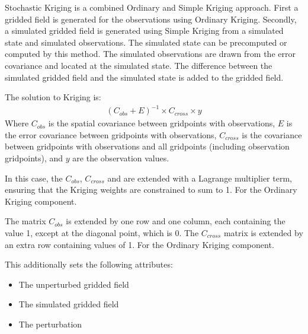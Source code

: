 \documentclass[letterpaper,10pt,english]{sphinxmanual}
\begin{document}
\begin{fulllineitems}
\begin{fulllineitems}
\sphinxAtStartPar
Stochastic Kriging is a combined Ordinary and Simple Kriging approach.
First a gridded field is generated for the observations using Ordinary
Kriging. Secondly, a simulated gridded field is generated using Simple
Kriging from a simulated state and simulated observations. The simulated
state can be pre\sphinxhyphen{}computed or computed by this method. The simulated
observations are drawn from the error covariance and located at the
simulated state. The difference between the simulated gridded field and
the simulated state is added to the gridded field.

\sphinxAtStartPar
The solution to Kriging is:
\begin{equation*}
\begin{split}(C_{obs} + E)^{-1} \times C_{cross} \times y\end{split}
\end{equation*}
\sphinxAtStartPar
Where \(C_{obs}\) is the spatial covariance between grid\sphinxhyphen{}points
with observations, \(E\) is the error covariance between grid\sphinxhyphen{}points
with observations, \(C_{cross}\) is the covariance between
grid\sphinxhyphen{}points with observations and all grid\sphinxhyphen{}points (including observation
grid\sphinxhyphen{}points), and \(y\) are the observation values.

\sphinxAtStartPar
In this case, the \(C_{obs}\), \(C_{cross}\) and are extended
with a Lagrange multiplier term, ensuring that the Kriging weights are
constrained to sum to 1. For the Ordinary Kriging component.

\sphinxAtStartPar
The matrix \(C_{obs}\) is extended by one row and one column, each
containing the value 1, except at the diagonal point, which is 0. The
\(C_{cross}\) matrix is extended by an extra row containing values
of 1. For the Ordinary Kriging component.

\sphinxAtStartPar
This additionally sets the following attributes:
\begin{itemize}
\item {}
\sphinxAtStartPar
{} \sphinxhyphen{} The unperturbed gridded field

\item {}
\sphinxAtStartPar
{} \sphinxhyphen{} The simulated gridded field

\item {}
\sphinxAtStartPar
{} \sphinxhyphen{} The perturbation


\end{itemize}
\end{fulllineitems}
\end{fulllineitems}
\end{document}
